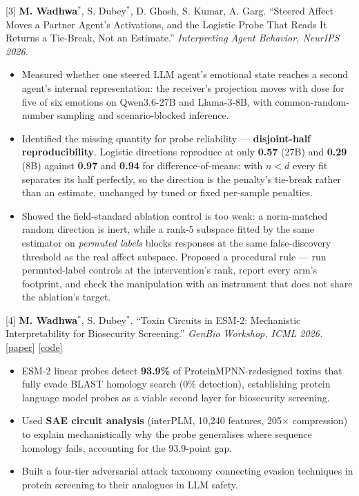 \documentclass[letterpaper,10pt]{article}
\newcommand{\paperlink}[1]{\href{#1}{[paper]}}
\newcommand{\codelink}[1]{\href{#1}{[code]}}
\begin{document}
\vspace{3pt}
\small{[3] \textbf{M. Wadhwa}$^{*}$, S. Dubey$^{*}$, D. Ghosh, S. Kumar, A. Garg. ``Steered Affect Moves a Partner Agent's Activations, and the Logistic Probe That Reads It Returns a Tie-Break, Not an Estimate.'' \textit{Interpreting Agent Behavior, NeurIPS 2026.}}
\begin{itemize}[leftmargin=0.3in, itemsep=1pt, topsep=2pt, parsep=0pt]
  \item \small Measured whether one steered LLM agent's emotional state reaches a second agent's internal representation: the receiver's projection moves with dose for five of six emotions on Qwen3.6-27B and Llama-3-8B, with common-random-number sampling and scenario-blocked inference.
  \item \small Identified the missing quantity for probe reliability --- \textbf{disjoint-half reproducibility}. Logistic directions reproduce at only \textbf{0.57} (27B) and \textbf{0.29} (8B) against \textbf{0.97} and \textbf{0.94} for difference-of-means: with $n < d$ every fit separates its half perfectly, so the direction is the penalty's tie-break rather than an estimate, unchanged by tuned or fixed per-sample penalties.
  \item \small Showed the field-standard ablation control is too weak: a norm-matched random direction is inert, while a rank-5 subspace fitted by the same estimator on \emph{permuted labels} blocks responses at the same false-discovery threshold as the real affect subspace. Proposed a procedural rule --- run permuted-label controls at the intervention's rank, report every arm's footprint, and check the manipulation with an instrument that does not share the ablation's target.
\end{itemize}


\vspace{3pt}
\small{[4] \textbf{M. Wadhwa}$^{*}$, S. Dubey$^{*}$. ``Toxin Circuits in ESM-2: Mechanistic Interpretability for Biosecurity Screening.'' \textit{GenBio Workshop, ICML 2026.} \paperlink{https://openreview.net/pdf?id=Nb3y9BzCOi} \codelink{https://github.com/Manan-Wadhwa/esm2}}
\begin{itemize}[leftmargin=0.3in, itemsep=1pt, topsep=2pt, parsep=0pt]
  \item \small ESM-2 linear probes detect \textbf{93.9\%} of ProteinMPNN-redesigned toxins that fully evade BLAST homology search (0\% detection), establishing protein language model probes as a viable second layer for biosecurity screening.
  \item \small Used \textbf{SAE circuit analysis} (interPLM, 10,240 features, 205$\times$ compression) to explain mechanistically why the probe generalises where sequence homology fails, accounting for the 93.9-point gap.
  \item \small Built a four-tier adversarial attack taxonomy connecting evasion techniques in protein screening to their analogues in LLM safety.
\end{itemize}
\end{document}
